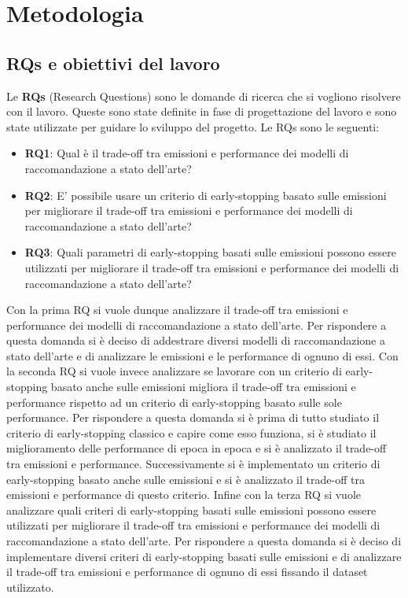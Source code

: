 \section{Metodologia}

\subsection{RQs e obiettivi del lavoro}

Le \textbf{RQs} (Research Questions) sono le domande di ricerca che si vogliono risolvere con il lavoro. Queste sono state definite in fase di progettazione del lavoro e sono state utilizzate per guidare lo sviluppo del progetto. Le RQs sono le seguenti:
\begin{itemize}
    \item \textbf{RQ1}: Qual è il trade-off tra emissioni e performance dei modelli di raccomandazione a stato dell'arte?
    \item \textbf{RQ2}: E' possibile usare un criterio di early-stopping basato sulle emissioni per migliorare il trade-off tra emissioni e performance dei modelli di raccomandazione a stato dell'arte?
    \item \textbf{RQ3}: Quali parametri di early-stopping basati sulle emissioni possono essere utilizzati per migliorare il trade-off tra emissioni e performance dei modelli di raccomandazione a stato dell'arte?
\end{itemize}

\noindent Con la prima RQ si vuole dunque analizzare il trade-off tra emissioni e performance dei modelli di raccomandazione a stato dell'arte. Per rispondere a questa domanda si è deciso di addestrare diversi modelli di raccomandazione a stato dell'arte e di analizzare le emissioni e le performance di ognuno di essi. Con la seconda RQ si vuole invece analizzare se lavorare con un criterio di early-stopping basato anche sulle emissioni migliora il trade-off tra emissioni e performance rispetto ad un criterio di early-stopping basato sulle sole performance. Per rispondere a questa domanda si è prima di tutto studiato il criterio di early-stopping classico e capire come esso funziona, si è studiato il miglioramento delle performance di epoca in epoca e si è analizzato il trade-off tra emissioni e performance. Successivamente si è implementato un criterio di early-stopping basato anche sulle emissioni e si è analizzato il trade-off tra emissioni e performance di questo criterio. Infine con la terza RQ si vuole analizzare quali criteri di early-stopping basati sulle emissioni possono essere utilizzati per migliorare il trade-off tra emissioni e performance dei modelli di raccomandazione a stato dell'arte. Per rispondere a questa domanda si è deciso di implementare diversi criteri di early-stopping basati sulle emissioni e di analizzare il trade-off tra emissioni e performance di ognuno di essi fissando il dataset utilizzato.

